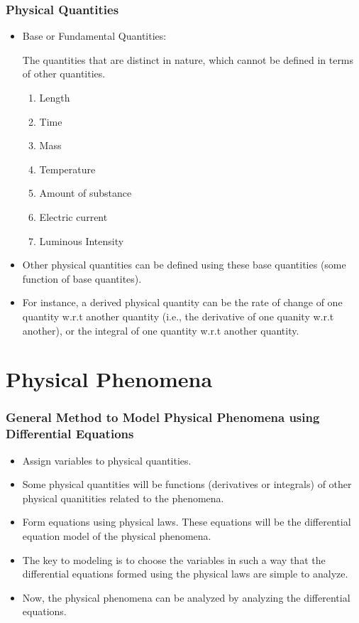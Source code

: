 \documentclass[10pt]{beamer}
\begin{document}
\begin{frame}
    \fontsize{9pt}{10pt}\selectfont
    \frametitle{Physical Quantities}
    \begin{itemize}
        \item Base or Fundamental Quantities:

            \quad \quad The quantities that are distinct in nature, which cannot be defined in terms of other quantities.

            \begin{enumerate}
                \item Length
                \item Time
                \item Mass
                \item Temperature
                \item Amount of substance
                \item Electric current
                \item Luminous Intensity
            \end{enumerate}

            \bigskip

        \item Other physical quantities can be defined using these base quantities (some function of base quantites).
        \item For instance, a derived physical quantity can be the rate of change of one quantity w.r.t another quantity (i.e., the derivative of one quanity w.r.t another), or the integral of one quantity w.r.t another quantity.
    \end{itemize}
\end{frame}

\section{Physical Phenomena}

\begin{frame}
    \frametitle{General Method to Model Physical Phenomena using Differential Equations}
    \begin{itemize}
        \item Assign variables to physical quantities.
        \item Some physical quantities will be functions (derivatives or integrals) of other physical quanitities related to the phenomena.
        \item Form equations using physical laws. These equations will be the differential equation model of the physical phenomena.
        \item The key to modeling is to choose the variables in such a way that the differential equations formed using the physical laws are simple to analyze.
        \item Now, the physical phenomena can be analyzed by analyzing the differential equations.
    \end{itemize}
\end{frame}
\end{document}
